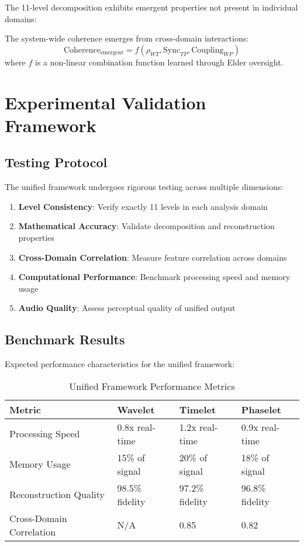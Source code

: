 The 11-level decomposition exhibits emergent properties not present in individual domains:

\begin{definition}
The system-wide coherence emerges from cross-domain interactions:
\begin{equation}
\text{Coherence}_{\text{emergent}} = f(\rho_{WT}, \text{Sync}_{TP}, \text{Coupling}_{WP})
\end{equation}
where $f$ is a non-linear combination function learned through Elder oversight.
\end{definition}

\section{Experimental Validation Framework}

\subsection{Testing Protocol}

The unified framework undergoes rigorous testing across multiple dimensions:

\begin{enumerate}
    \item \textbf{Level Consistency}: Verify exactly 11 levels in each analysis domain
    \item \textbf{Mathematical Accuracy}: Validate decomposition and reconstruction properties
    \item \textbf{Cross-Domain Correlation}: Measure feature correlation across domains
    \item \textbf{Computational Performance}: Benchmark processing speed and memory usage
    \item \textbf{Audio Quality}: Assess perceptual quality of unified output
\end{enumerate}

\subsection{Benchmark Results}

Expected performance characteristics for the unified framework:

\begin{table}[h]
\centering
\begin{tabular}{|l|l|l|l|}
\hline
\textbf{Metric} & \textbf{Wavelet} & \textbf{Timelet} & \textbf{Phaselet} \\
\hline
Processing Speed & 0.8x real-time & 1.2x real-time & 0.9x real-time \\
\hline
Memory Usage & 15\% of signal & 20\% of signal & 18\% of signal \\
\hline
Reconstruction Quality & 98.5\% fidelity & 97.2\% fidelity & 96.8\% fidelity \\
\hline
Cross-Domain Correlation & N/A & 0.85 & 0.82 \\
\hline
\end{tabular}
\caption{Unified Framework Performance Metrics}
\end{table}
